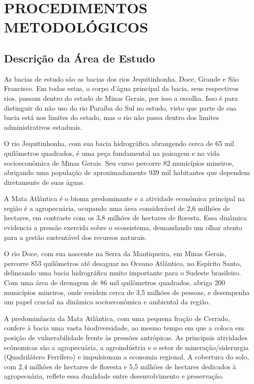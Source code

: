\chapter{PROCEDIMENTOS METODOLÓGICOS}
\section{Descrição da Área de Estudo}


As bacias de estudo são as bacias dos rios Jequitinhonha, Doce, Grande e São Francisco. Em todas estas, o corpo d'água principal da bacia, seus respectivos rios, passam dentro do estado de Minas Gerais, por isso a escolha. Isso é para distinguir do não uso do rio Paraíba do Sul no estudo, visto que parte de sua bacia está nos limites do estado, mas o rio não passa dentro dos limites administrativos estaduais.

O rio Jequitinhonha, com sua bacia hidrográfica abrangendo cerca de 65 mil quilômetros quadrados, é uma peça fundamental na paisagem e na vida socioeconômica de Minas Gerais. Seu curso percorre 82 municípios mineiros, abrigando uma população de aproximadamente 939 mil habitantes que dependem diretamente de suas águas.\cite{ibge} \cite{jequiti_igam_mg_1} \cite{jequiti_igam_mg_2} \cite{jequiti_igam_mg_3}

A Mata Atlântica é o bioma predominante e a atividade econômica principal na região é a agropecuária, ocupando uma área considerável de 2,6 milhões de hectares, em contraste com os 3,8 milhões de hectares de floresta. Essa dinâmica evidencia a pressão exercida sobre o ecossistema, demandando um olhar atento para a gestão sustentável dos recursos naturais.\cite{mapbiomas}

O rio Doce, com sua nascente na Serra da Mantiqueira, em Minas Gerais, percorre 853 quilômetros até desaguar no Oceano Atlântico, no Espírito Santo, delineando uma bacia hidrográfica muito importante para o Sudeste brasileiro. Com uma área de drenagem de 86 mil quilômetros quadrados, abriga 200 municípios mineiros, onde residem cerca de 3,5 milhões de pessoas, e desempenha um papel crucial na dinâmica socioeconômica e ambiental da região. 

A predominância da Mata Atlântica, com uma pequena fração de Cerrado, confere à bacia uma vasta biodiversidade, ao mesmo tempo em que a coloca em posição de vulnerabilidade frente às pressões antrópicas. As principais atividades ecônomicas são a agropecuária, a agroindústria e o setor de mineração/siderurgia (Quadrilátero Ferrífero) e impulsionam a economia regional. A cobertura do solo, com 2,4 milhões de hectares de floresta e 5,5 milhões de hectares dedicados à agropecuária, reflete essa dualidade entre desenvolvimento e preservação.

